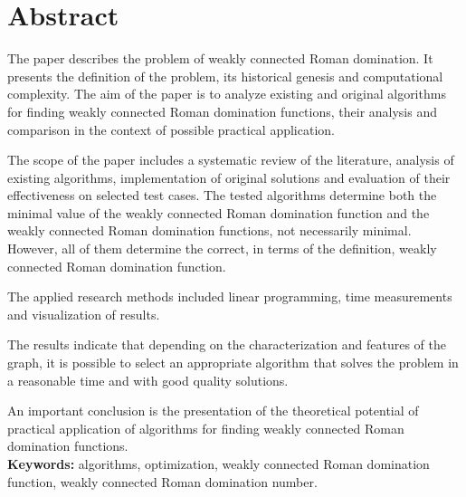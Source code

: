 \chapter*{Abstract}
The paper describes the problem of weakly connected Roman domination. It presents the definition of the problem, its historical genesis and computational complexity. The aim of the paper is to analyze existing and original algorithms for finding weakly connected Roman domination functions, their analysis and comparison in the context of possible practical application.

The scope of the paper includes a systematic review of the literature, analysis of existing algorithms, implementation of original solutions and evaluation of their effectiveness on selected test cases. The tested algorithms determine both the minimal value of the weakly connected Roman domination function and the weakly connected Roman domination functions, not necessarily minimal. However, all of them determine the correct, in terms of the definition, weakly connected Roman domination function.

The applied research methods included linear programming, time measurements and visualization of results.

The results indicate that depending on the characterization and features of the graph, it is possible to select an appropriate algorithm that solves the problem in a reasonable time and with good quality solutions.

An important conclusion is the presentation of the theoretical potential of practical application of algorithms for finding weakly connected Roman domination functions.\\

\textbf{Keywords:} algorithms, optimization, weakly connected Roman domination function, weakly connected Roman domination number.
